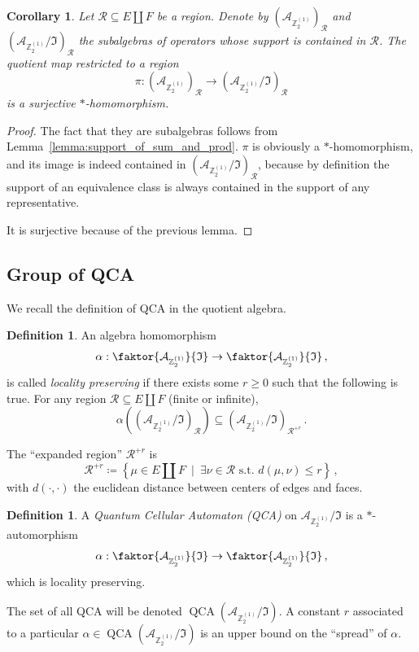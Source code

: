 \documentclass[aps,twocolumn,prx,floatfix,preprintnumbers, nofootinbib,10pt]{revtex4-2}
\numberwithin{equation}{section}
\newtheorem{corollary}[theorem]{Corollary}
\theoremstyle{definition}
\newtheorem{definition}[theorem]{Definition}
\theoremstyle{remark}
\theoremstyle{claim}
\newcommand{\be}{\begin{equation}}
\newcommand{\ee}{\end{equation}}
\newcommand{\Z}{{\mathbb Z}}
\newcommand{\mc}[1]{\mathcal{#1}}
\newcommand{\paren}[1]{\left( #1 \right)}
\newcommand{\curpar}[1]{\left\{ #1 \right\}}
\begin{document}
\begin{corollary}
 Let $\mc{R} \subseteq E \coprod F$ be a region. Denote by $\paren{\mc{A}_{\Z_2^{(1)}}}_{\mc{R}}$ and $\paren{\mc{A}_{\Z_2^{(1)}} / \mathfrak{I}}_{\mc{R}}$ the subalgebras of operators whose support is contained in $\mc{R}$. The quotient map restricted to a region
 \be
 \pi : \paren{\mc{A}_{\Z_2^{(1)}}}_{\mc{R}} \rightarrow \paren{\mc{A}_{\Z_2^{(1)}} / \mathfrak{I}}_{\mc{R}}
 \ee
 is a surjective $*$-homomorphism.
\end{corollary}

\begin{proof}
 The fact that they are subalgebras follows from Lemma~\ref{lemma:support_of_sum_and_prod}. $\pi$ is obviously a $*$-homomorphism, and its image is indeed contained in $\paren{\mc{A}_{\Z_2^{(1)}} / \mathfrak{I}}_{\mc{R}}$, because by definition the support of an equivalence class is always contained in the support of any representative.

 It is surjective because of the previous lemma.
\end{proof}

\subsection{Group of QCA}

We recall the definition of QCA in the quotient algebra. 

\begin{definition}
 An algebra homomorphism 
 \be
 \alpha : \faktor{\mc{A}_{\Z_2^{(1)}}}{\mathfrak{I}} \rightarrow \faktor{\mc{A}_{\Z_2^{(1)}}}{\mathfrak{I}} \,,
 \ee
 is called \emph{locality preserving} if there exists some $r \geq 0$ such that the following is true. For any region $\mc{R} \subseteq E \coprod F$ (finite or infinite),
 \be
 \alpha\paren{\paren{\mc{A}_{\Z_2^{(1)}} / \mathfrak{I}}_\mc{R}} \subseteq \paren{\mc{A}_{\Z_2^{(1)}} / \mathfrak{I}}_{\mc{R}^{+r}} \,.
 \ee

 The ``expanded region'' $\mc{R}^{+r}$ is
 \be
 \mc{R}^{+r} \coloneqq \curpar{\mu \in E \coprod F \ \mid \ \exists \nu \in \mc{R} \text{ s.t. } d(\mu, \nu) \leq r} \,,
 \ee
 with $d(\cdot, \cdot)$ the euclidean distance between centers of edges and faces.
\end{definition}

\begin{definition}
 A \emph{Quantum Cellular Automaton (QCA)} on $\mc{A}_{\Z_2^{(1)}} / \mathfrak{I}$ is a $*$-automorphism
 \be
 \alpha : \faktor{\mc{A}_{\Z_2^{(1)}}}{\mathfrak{I}} \rightarrow \faktor{\mc{A}_{\Z_2^{(1)}}}{\mathfrak{I}} \,,
 \ee
 which is locality preserving.

 The set of all QCA will be denoted $\operatorname{QCA}(\mc{A}_{\Z_2^{(1)}} / \mathfrak{I})$. A constant $r$ associated to a particular $\alpha \in \operatorname{QCA}(\mc{A}_{\Z_2^{(1)}} / \mathfrak{I})$ is an upper bound on the ``spread'' of $\alpha$.
\end{definition}
\end{document}
